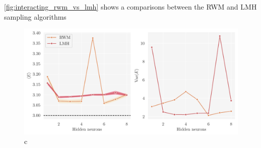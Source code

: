 \autoref{fig:interacting_rwm_vs_lmh} shows a comparisons between the RWM and LMH sampling algorithms 

\begin{figure}[!htb]
\begin{center}\includegraphics[width=\textwidth]{latex/figures/interacting_rwm_vs_lmh.pdf}
\end{center}
\caption{c}
\label{fig:interacting_rwm_vs_lmh}
\end{figure}












